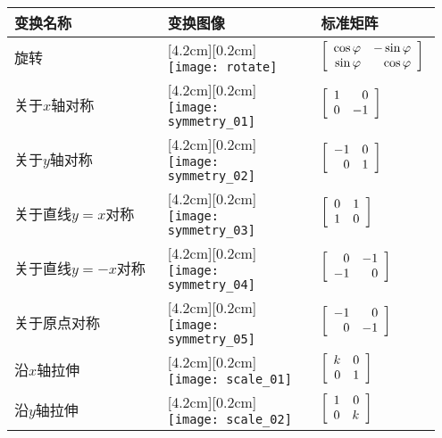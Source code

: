 \begin{longtable}{>{\raggedright}m{0.35\linewidth}>{\centering}m{0.35\linewidth}>{\centering\arraybackslash}m{0.25\linewidth}}
\hline
变换名称 & 变换图像 & 标准矩阵\\\hline
旋转 & \raisebox{0pt}[4.2cm][0.2cm]{\texttt{[image: rotate]}} & $\left[\begin{array}{r r}\cos\varphi & -\sin\varphi\\ \sin\varphi & \cos\varphi\end{array}\right]$\\\hline
关于$x$轴对称 & \raisebox{0pt}[4.2cm][0.2cm]{\texttt{[image: symmetry\_01]}} & $\left[\begin{array}{r r} 1 & 0\\ 0 & -1\end{array}\right]$\\\hline
关于$y$轴对称 & \raisebox{0pt}[4.2cm][0.2cm]{\texttt{[image: symmetry\_02]}} & $\left[\begin{array}{r r} -1 & 0\\ 0 & 1\end{array}\right]$\\\hline
关于直线$y=x$对称 & \raisebox{0pt}[4.2cm][0.2cm]{\texttt{[image: symmetry\_03]}} & $\left[\begin{array}{r r} 0 & 1\\ 1 & 0\end{array}\right]$\\\hline
关于直线$y=-x$对称 & \raisebox{0pt}[4.2cm][0.2cm]{\texttt{[image: symmetry\_04]}} & $\left[\begin{array}{r r} 0 & -1\\ -1 & 0\end{array}\right]$\\\hline
关于原点对称 & \raisebox{0pt}[4.2cm][0.2cm]{\texttt{[image: symmetry\_05]}} & $\left[\begin{array}{r r} -1 & 0\\ 0 & -1\end{array}\right]$\\\hline
沿$x$轴拉伸 & \raisebox{0pt}[4.2cm][0.2cm]{\texttt{[image: scale\_01]}} & $\left[\begin{array}{r r} k & 0\\ 0 & 1\end{array}\right]$\\\hline
沿$y$轴拉伸 & \raisebox{0pt}[4.2cm][0.2cm]{\texttt{[image: scale\_02]}} & $\left[\begin{array}{r r} 1 & 0\\ 0 & k\end{array}\right]$\\\hline

\end{longtable}
